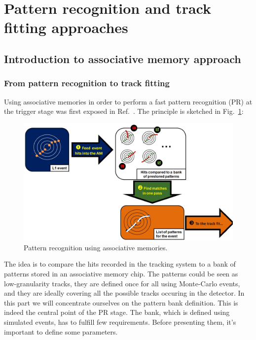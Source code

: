 \section{Pattern recognition and track fitting approaches}

\subsection{Introduction to associative memory approach}

\subsubsection{From pattern recognition to track fitting}

\noindent Using associative memories in order to perform a fast pattern recognition (PR) at the trigger stage was first exposed in Ref.~\cite{bib:Del-89}. The principle is sketched in Fig.~\ref{fig:AM_principle}:
\begin{figure}[ht!]
\centering
\includegraphics[width=0.7\columnwidth]{Plots/TriggerAM.eps}
\caption{Pattern recognition using associative memories.}
\label{fig:AM_principle}
\end{figure}

\noindent The idea is to compare the hits recorded in the tracking system to a bank of patterns stored in an associative memory chip. The patterns could be seen as low-granularity tracks, they are defined once for all using Monte-Carlo events, and they are ideally covering all the possible tracks occuring in the detector. In this part we will concentrate ourselves on the pattern bank definition. This is indeed the central point of the PR stage. The bank, which is defined using simulated events, has to fulfill few requirements. Before presenting them, it's important to define some parameters. 

